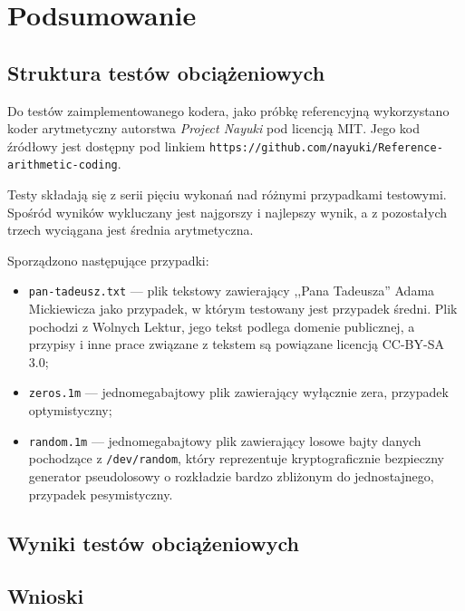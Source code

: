 \documentclass[../../thesis.tex]{subfiles}
\begin{document}
\chapter{Podsumowanie}

\section{Struktura testów obciążeniowych}

Do testów zaimplementowanego kodera, jako próbkę referencyjną
wykorzystano koder arytmetyczny autorstwa \emph{Project Nayuki}
pod licencją MIT. Jego kod źródłowy jest dostępny pod linkiem
\verb|https://github.com/nayuki/Reference-arithmetic-coding|.

Testy składają się z serii pięciu wykonań nad różnymi przypadkami
testowymi. Spośród wyników wykluczany jest najgorszy i najlepszy
wynik, a z pozostałych trzech wyciągana jest średnia arytmetyczna.

Sporządzono następujące przypadki:
\begin{itemize}
  \item \texttt{pan-tadeusz.txt} --- plik tekstowy zawierający
    ,,Pana Tadeusza'' Adama Mickiewicza jako przypadek, w którym
    testowany jest przypadek średni. Plik pochodzi z Wolnych Lektur,
    jego tekst podlega domenie publicznej, a przypisy i inne
    prace związane z tekstem są powiązane licencją CC-BY-SA 3.0;
  \item \texttt{zeros.1m} --- jednomegabajtowy plik zawierający
    wyłącznie zera, przypadek optymistyczny;
  \item \texttt{random.1m} --- jednomegabajtowy plik zawierający 
    losowe bajty danych pochodzące z \texttt{/dev/random}, który
    reprezentuje kryptograficznie bezpieczny generator pseudolosowy
    o rozkładzie bardzo zbliżonym do jednostajnego, przypadek
    pesymistyczny.
\end{itemize}

\section{Wyniki testów obciążeniowych}



\section{Wnioski}
\end{document}
